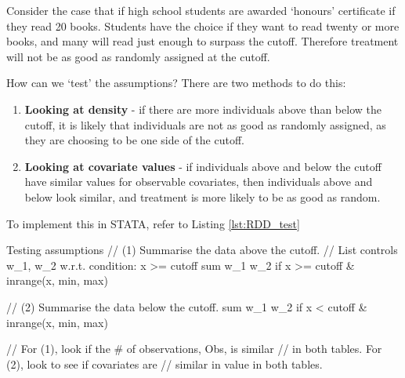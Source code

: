             \begin{example}
                Consider the case that if high school students are awarded `honours' certificate if they read 20 books. Students have the choice if they want to read twenty or more books, and many will read just enough to surpass the cutoff. Therefore treatment will not be as good as randomly assigned at the cutoff.
            \end{example}
            How can we `test' the assumptions? There are two methods to do this:
            \begin{enumerate}
                \item \textbf{Looking at density} - if there are more individuals above than below the cutoff, it is likely that individuals are not as good as randomly assigned, as they are choosing to be one side of the cutoff.
                \item \textbf{Looking at covariate values} - if individuals above and below the cutoff have similar values for observable covariates, then individuals above and below look similar, and treatment is more likely to be as good as random.
            \end{enumerate}
            To implement this in STATA, refer to Listing \ref{lst:RDD_test}
            \begin{sexylisting}[colback=white, label=lst:RDD/test_assumption]{Testing assumptions}
//  (1) Summarise the data above the cutoff. 
//  List controls w_1, w_2 w.r.t. condition: x >= cutoff
    sum w_1 w_2 if x >= cutoff & inrange(x, min, max)
    
//  (2) Summarise the data below the cutoff.
    sum w_1 w_2 if x < cutoff & inrange(x, min, max)

//  For (1), look if the # of observations, Obs, is similar
//  in both tables. For (2), look to see if covariates are
//  similar in value in both tables.
            \end{sexylisting}

